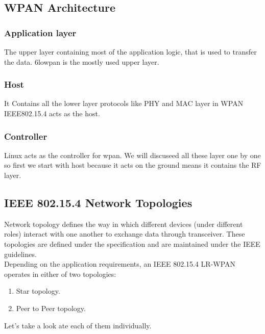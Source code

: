 \subsection{WPAN Architecture}
\subsubsection{Application layer}  The upper layer containing most of the application logic, that is used to transfer the data. 6lowpan is the mostly used upper layer.
\subsubsection{Host} It Contains all the lower layer protocols like PHY and MAC layer in WPAN IEEE802.15.4 acts as the host.
\subsubsection{Controller}  Linux acts as the controller for wpan.
We will discuseed all these layer one by one so first we start with host because it acts on the ground means it contains the RF layer.
\subsection{IEEE 802.15.4 Network Topologies}
Network topology defines the way in which different devices (under different roles) interact with one another to exchange data through transceiver. These topologies are defined under the specification and are maintained under the IEEE guidelines.\\
Depending on the application requirements, an IEEE 802.15.4 LR-WPAN operates in either of two topologies:
\begin{enumerate}
	\item Star topology.
	\item Peer to Peer topology.
\end{enumerate}
Let's take a look ate each of them individually.
